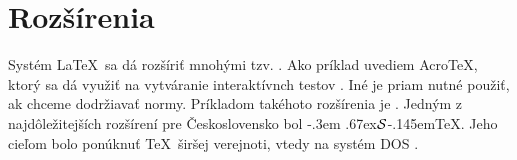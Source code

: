 \documentclass[a4paper, 11pt]{article}
\DeclareRobustCommand\CSTeX{\leavevmode{$\cal C$}\kern-.3em \lower .67ex\hbox{$\cal S$}\kern-.145em\TeX} %
\begin{document}
\section{Rozšírenia}
Systém \LaTeX\ sa dá rozšíriť mnohými tzv. . Ako príklad uvediem Acro\TeX, ktorý sa dá využiť na vytváranie interaktívnch testov \cite{online2010}. Iné je priam nutné použiť, ak chceme dodržiavať normy. Príkladom takéhoto rozšírenia je  \cite{FITBT7848}. Jedným z najdôležitejších rozšírení pre Československo bol \CSTeX{}. Jeho cieľom bolo ponúknuť \TeX\ širšej verejnoti, vtedy na systém DOS \cite{CSTUG}.

\newpage


\end{document}
